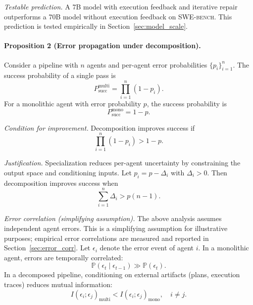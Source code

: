 \documentclass[journal]{IEEEtran}
\newcommand{\swebench}{\textsc{SWE-bench}}
\begin{document}
\textit{Testable prediction.}
A 7B model with execution feedback and iterative repair outperforms a 70B model without execution feedback on \swebench{}. This prediction is tested empirically in Section~\ref{sec:model_scale}.

\paragraph{Proposition 2 (Error propagation under decomposition).}
Consider a pipeline with $n$ agents and per-agent error probabilities $\{p_i\}_{i=1}^n$. The success probability of a single pass is
\begin{equation}
P_{\text{succ}}^{\text{multi}} = \prod_{i=1}^{n} (1 - p_i).
\end{equation}
For a monolithic agent with error probability $p$, the success probability is
\begin{equation}
P_{\text{succ}}^{\text{mono}} = 1 - p.
\end{equation}

\textit{Condition for improvement.}
Decomposition improves success if
\begin{equation}
\prod_{i=1}^{n} (1 - p_i) > 1 - p.
\end{equation}

\textit{Justification.}
Specialization reduces per-agent uncertainty by constraining the output space and conditioning inputs. Let $p_i = p - \Delta_i$ with $\Delta_i > 0$. Then decomposition improves success when
\begin{equation}
\sum_{i=1}^{n} \Delta_i > p (n - 1).
\end{equation}

\textit{Error correlation (simplifying assumption).}
The above analysis assumes independent agent errors. This is a simplifying assumption for illustrative purposes; empirical error correlations are measured and reported in Section~\ref{sec:error_corr}. Let $\epsilon_i$ denote the error event of agent $i$. In a monolithic agent, errors are temporally correlated:
\begin{equation}
\mathbb{P}(\epsilon_t \mid \epsilon_{t-1}) \gg \mathbb{P}(\epsilon_t).
\end{equation}
In a decomposed pipeline, conditioning on external artifacts (plans, execution traces) reduces mutual information:
\begin{equation}
I(\epsilon_i; \epsilon_j)_{\text{multi}} < I(\epsilon_i; \epsilon_j)_{\text{mono}}, \quad i \neq j.
\end{equation}
\end{document}
